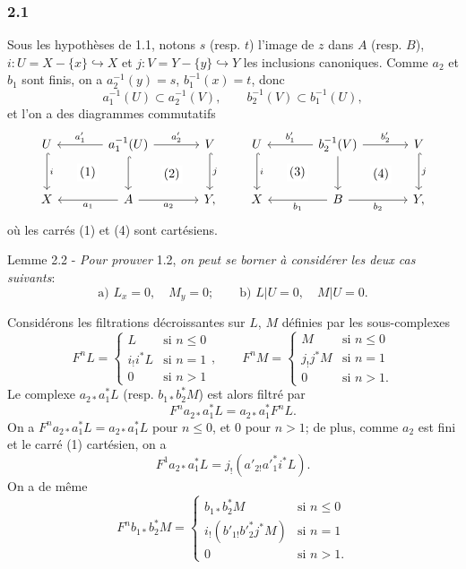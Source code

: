 \subsubsection*{2.1}
Sous les hypothèses de 1.1, notons $s$ (resp. $t$) l'image de $z$ dans $A$ (resp. $B$), $i:U=X-\{x\}\hookrightarrow X$ et $j:V=Y-\{y\}\hookrightarrow Y$ les inclusions canoniques. Comme $a_2$ et $b_1$ sont finis, on a $a_2^{-1}(y)=s$, $b_1^{-1}(x)=t$, donc
\[
a_1^{-1}(U)\subset a_2^{-1}(V),\qquad b_2^{-1}(V)\subset b_1^{-1}(U),
\]
et l'on a des diagrammes commutatifs
\[
\begin{tikzcd}[column sep=large,row sep=large]
U \arrow[d,hook,"i"] \arrow[rd,phantom,"(1)"{description}] & a_1^{-1}(U) \arrow[l,"a'_1"'] \arrow[r,"a'_2"] \arrow[d,hook] \arrow[rd,phantom,"(2)"{description}] & V \arrow[d,hook,"j"]\\
X & A \arrow[l,"a_1"] \arrow[r,"a_2"'] & Y ,
\end{tikzcd}
\qquad
\begin{tikzcd}[column sep=large,row sep=large]
U \arrow[d,hook,"i"] \arrow[rd,phantom,"(3)"{description}] & b_2^{-1}(V) \arrow[l,"b'_1"'] \arrow[r,"b'_2"] \arrow[d] \arrow[rd,phantom,"(4)"{description}] & V \arrow[d,hook,"j"]\\
X & B \arrow[l,"b_1"] \arrow[r,"b_2"'] & Y ,
\end{tikzcd}
\]
où les carrés (1) et (4) sont cartésiens.

\begin{statement}{Lemme 2.2 -}
\emph{Pour prouver} 1.2, \emph{on peut se borner à considérer les deux cas suivants}:
\[
\text{a) } L_x=0,\quad M_y=0;\qquad
\text{b) } L|U=0,\quad M|U=0 .
\]
\end{statement}

Considérons les filtrations décroissantes sur $L$, $M$ définies par les sous-complexes
\[
F^nL=
\begin{cases}
L & \text{si } n\le 0\\
i_!i^*L & \text{si } n=1\\
0 & \text{si } n>1
\end{cases}
,\qquad
F^nM=
\begin{cases}
M & \text{si } n\le 0\\
j_!j^*M & \text{si } n=1\\
0 & \text{si } n>1.
\end{cases}
\]
Le complexe $a_{2*}a_1^*L$ (resp. $b_{1*}b_2^*M$) est alors filtré par
\[
F^n a_{2*}a_1^*L=a_{2*}a_1^*F^nL.
\]
On a $F^n a_{2*}a_1^*L=a_{2*}a_1^*L$ pour $n\le 0$, et $0$ pour $n>1$; de plus, comme $a_2$ est fini et le carré (1) cartésien, on a
\[
F^1a_{2*}a_1^*L=j_!(a'_{2!}a'^*_1i^*L).
\]
On a de même
\[
F^n b_{1*}b_2^*M=
\begin{cases}
b_{1*}b_2^*M & \text{si } n\le 0\\
i_!(b'_{1!}b'^*_2j^*M) & \text{si } n=1\\
0 & \text{si } n>1.
\end{cases}
\]

